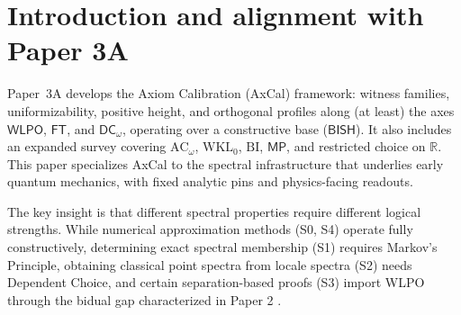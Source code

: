 \documentclass[11pt]{article}
\newcommand{\WLPO}{\mathsf{WLPO}}
\newcommand{\FT}{\mathsf{FT}}
\newcommand{\DCw}{\mathsf{DC}_{\omega}}
\newcommand{\MP}{\mathsf{MP}}
\theoremstyle{plain}
\theoremstyle{definition}
\theoremstyle{remark}
\newcommand{\R}{\mathbb{R}}
\newcommand{\BISH}{\mathsf{BISH}}
\newcommand{\ACw}{\mathrm{AC}_\omega}
\newcommand{\WKLz}{\mathrm{WKL}_0}
\newcommand{\BI}{\mathrm{BI}}
\begin{document}
\tableofcontents

\noindent{}

\section{Introduction and alignment with Paper 3A}

Paper~3A \cite{Paper3A} develops the Axiom Calibration (AxCal) framework: witness families, uniformizability, positive height, and orthogonal profiles
along (at least) the axes $\WLPO$, $\FT$, and $\DCw$, operating over a constructive base ($\BISH$). It also includes an expanded survey covering $\ACw$, $\WKLz$, $\BI$, $\MP$, and restricted choice on $\R$.
This paper specializes AxCal to the spectral infrastructure that underlies early quantum mechanics,
with fixed analytic pins and physics-facing readouts.

The key insight is that different spectral properties require different logical strengths. While numerical approximation methods (S0, S4) operate fully constructively, 
determining exact spectral membership (S1) requires Markov's Principle, obtaining classical point spectra from locale spectra (S2) needs Dependent Choice, 
and certain separation-based proofs (S3) import WLPO through the bidual gap characterized in Paper 2 \cite{Paper2}.
\end{document}
